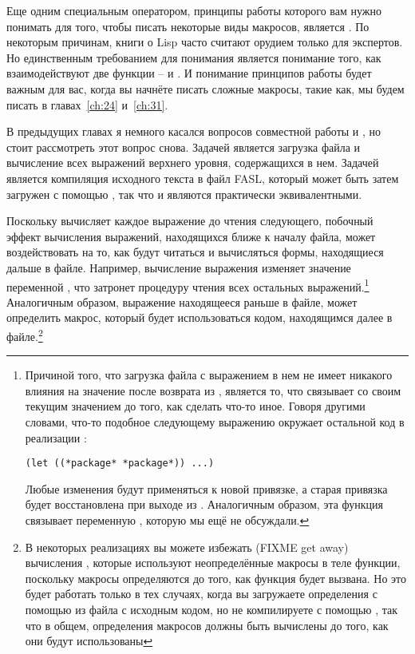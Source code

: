 Еще одним специальным оператором, принципы работы которого вам нужно понимать для того,
чтобы писать некоторые виды макросов, является .  По некоторым причинам,
книги о Lisp часто считают  орудием только для экспертов.  Но единственным
требованием для понимания  является понимание того, как взаимодействуют
две функции --  и .  И понимание принципов работы
 будет важным для вас, когда вы начнёте писать сложные макросы, такие как,
мы будем писать в главах~\ref{ch:24} и~\ref{ch:31}.

В предыдущих главах я немного касался вопросов совместной работы  и
, но стоит рассмотреть этот вопрос снова.  Задачей  является
загрузка файла и вычисление всех выражений верхнего уровня, содержащихся в нем.  Задачей
 является компиляция исходного текста в файл FASL, который может быть
затем загружен с помощью , так что  и  являются практически эквивалентными.

Поскольку  вычисляет каждое выражение до чтения следующего, побочный эффект
вычисления выражений, находящихся ближе к началу файла, может воздействовать на то, как
будут читаться и вычисляться формы, находящиеся дальше в файле.  Например, вычисление
выражения  изменяет значение переменной , что затронет
процедуру чтения всех остальных выражений.\footnote{Причиной того, что загрузка файла с
  выражением  в нем не имеет никакого влияния на значение
   после возврата из , является то, что  связывает
   со своим текущим значением до того, как сделать что-то иное.  Говоря
  другими словами, что-то подобное следующему выражению  окружает остальной код
  в реализации :

\begin{lstlisting}
(let ((*package* *package*)) ...)
\end{lstlisting}

Любые изменения  будут применяться к новой привязке, а старая привязка
будет восстановлена при выходе из .  Аналогичным образом, эта функция связывает
переменную , которую мы ещё не обсуждали.}  Аналогичным образом,
выражение  находящееся раньше в файле, может определить макрос, который
будет использоваться кодом, находящимся далее в файле.\footnote{В некоторых реализациях вы
  можете избежать (FIXME get away) вычисления , которые используют
  неопределённые макросы в теле функции, поскольку макросы определяются до того, как
  функция будет вызвана.  Но это будет работать только в тех случаях, когда вы загружаете
  определения с помощью  из файла с исходным кодом, но не компилируете с
  помощью , так что в общем, определения макросов должны быть вычислены
  до того, как они будут использованы}

